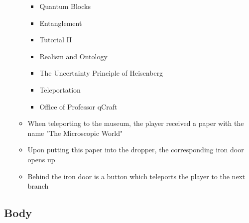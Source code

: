 \documentclass[11pt,twoside]{report} %
\begin{document}
\begin{itemize}
\begin{itemize}
\begin{itemize}
			\item Quantum Blocks
			\item Entanglement
			\item Tutorial II
			\item Realism and Ontology
			\item The Uncertainty Principle of Heisenberg
			\item Teleportation
			\item Office of Professor qCraft
		\end{itemize}
		\item When teleporting to the museum, the player received a paper with the name "The Microscopic World"
		\item Upon putting this paper into the dropper, the corresponding iron door opens up
		\item Behind the iron door is a button which teleports the player to the next branch
	\end{itemize}
\end{itemize}

\subsection{Body}
\end{document}
